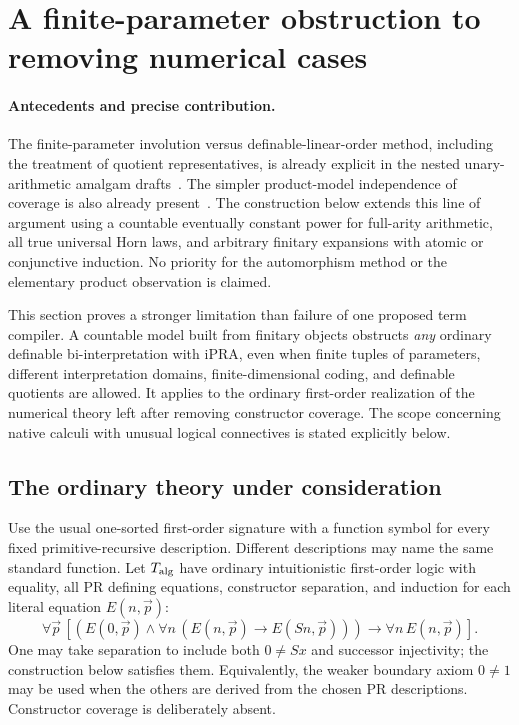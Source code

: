 \section{A finite-parameter obstruction to removing numerical cases}
\label{app:finite-parameter-obstruction}

\paragraph{Antecedents and precise contribution.}
The finite-parameter involution versus definable-linear-order method,
including the treatment of quotient representatives, is already explicit
in the nested unary-arithmetic amalgam drafts~\cite{prioramalgam}.
The simpler product-model independence of coverage is also already
present~\cite{priorproduct}. The construction below extends this line
of argument using a countable eventually constant power for full-arity
arithmetic, all true universal Horn laws, and arbitrary finitary
expansions with atomic or conjunctive induction. No priority for the
automorphism method or the elementary product observation is claimed.

This section proves a stronger limitation than failure of one proposed
term compiler.  A countable model built from finitary objects obstructs
\emph{any} ordinary definable bi-interpretation with iPRA, even when
finite tuples of parameters, different interpretation domains,
finite-dimensional coding, and definable quotients are allowed.
It applies to the ordinary first-order realization of the numerical
theory left after removing constructor coverage.  The scope concerning
native calculi with unusual logical connectives is stated explicitly
below.

\subsection{The ordinary theory under consideration}

Use the usual one-sorted first-order signature with a function symbol
for every fixed primitive-recursive description.  Different descriptions
may name the same standard function.  Let $T_{\rm alg}$ have ordinary
intuitionistic first-order logic with equality, all PR defining equations,
constructor separation, and induction for each literal equation
$E(n,\vec p)$:
\[
 \forall\vec p\,
 \left[
 \left(E(0,\vec p)\land
       \forall n\,(E(n,\vec p)\to E(Sn,\vec p))\right)
 \to\forall n\,E(n,\vec p)
 \right].
 \tag{EI}
\]
One may take separation to include both $0\ne Sx$ and successor
injectivity; the construction below satisfies them.  Equivalently,
the weaker boundary axiom $0\ne1$ may be used when the others are
derived from the chosen PR descriptions.  Constructor coverage is
deliberately absent.

